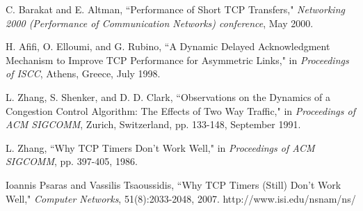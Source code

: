 \documentclass[12pt,onecolumn]{IEEEtran}
\begin{document}
\begin{thebibliography}{99}
C. Barakat and E. Altman, ``Performance of Short TCP Transfers," \emph{Networking 2000 (Performance of Communication Networks) conference}, May 2000.

H. Afifi, O. Elloumi, and G. Rubino, ``A Dynamic Delayed Acknowledgment Mechanism to Improve TCP Performance for Asymmetric Links," in \emph{ Proceedings of ISCC}, Athens, Greece, July 1998.


L. Zhang, S. Shenker, and D. D. Clark, ``Observations on the Dynamics of a Congestion Control Algorithm: The Effects of Two Way Traffic," in
\emph{Proceedings of ACM SIGCOMM}, Zurich, Switzerland, pp. 133-148, September 1991.

L. Zhang, ``Why TCP Timers Don't Work Well," in \emph{Proceedings of ACM SIGCOMM}, pp. 397-405, 1986.

Ioannis Psaras and Vassilis Tsaoussidis, ``Why TCP Timers (Still) Don't Work Well," \emph{Computer Networks}, 51(8):2033-2048, 2007.
http://www.isi.edu/nsnam/ns/


\end{thebibliography}
\end{document}
